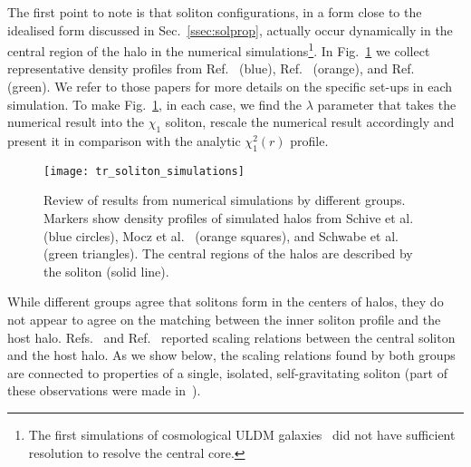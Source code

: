 \documentclass[aps,prd,floats,superscriptaddress,showpacs,nofootinbib,twocolumn,preprintnumbers]{revtex4-1}%
\begin{document}
The first point to note is that soliton configurations, in a form
close to the idealised form discussed in Sec.~\ref{ssec:solprop},
actually occur dynamically in the central region of the halo in the
numerical simulations\footnote{The first simulations of cosmological
  ULDM galaxies~\cite{Woo:2008nn} did not have sufficient resolution
  to resolve the central core.}. In Fig.~\ref{fig:soliton_simulations}
we collect representative density profiles from
Ref.~\cite{Schive:2014dra} (blue), Ref.~\cite{Mocz:2017wlg} (orange),
and Ref.~\cite{Schwabe:2016rze} (green). We refer to those papers for
more details on the specific set-ups in each simulation. To make
Fig.~\ref{fig:soliton_simulations}, in each case, we find the
$\lambda$ parameter that takes the numerical result into the $\chi_1$
soliton, rescale the numerical result accordingly and present it in
comparison with the analytic $\chi_1^2(r)$ profile. 
%
\begin{figure}[hbp!]
\centering
\texttt{[image: tr\_soliton\_simulations]}
\caption{
Review of results from numerical simulations by different
groups. Markers show density profiles of simulated halos 
from Schive et al.~\cite{Schive:2014dra}
(blue circles), Mocz et al.~\cite{Mocz:2017wlg} (orange squares), and
Schwabe et al.~\cite{Schwabe:2016rze} (green triangles). The central regions of
the halos are
described by the soliton (solid line). 
}\label{fig:soliton_simulations}
\end{figure}
%

While different groups agree that solitons form in the centers of
halos, they do not appear to agree on the matching between the inner
soliton profile and the host halo.  
Refs.~\cite{Schive:2014hza,Schive:2014dra} and
Ref.~\cite{Mocz:2017wlg} reported scaling relations between the
central soliton and the host halo. 
As we show below, the scaling relations found by
both groups are connected to properties of a single, isolated,
self-gravitating soliton (part of these observations were made
in~\cite{Veltmaat:2016rxo,Schwabe:2016rze}).  
\end{document}
